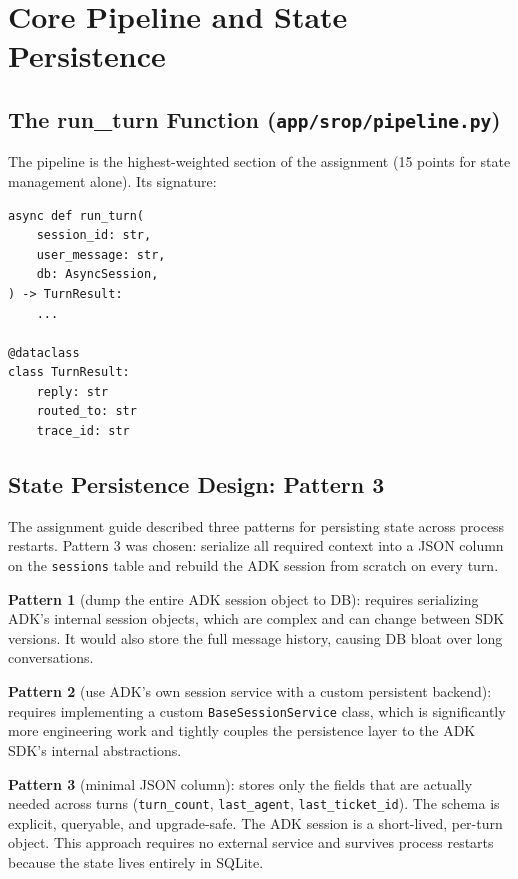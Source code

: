 \documentclass[12pt,a4paper]{article}
\begin{document}
\section{Core Pipeline and State Persistence}

\subsection{The run\_turn Function (\texttt{app/srop/pipeline.py})}

The pipeline is the highest-weighted section of the assignment (15 points for state management alone). Its signature:

\begin{lstlisting}[style=python]
async def run_turn(
    session_id: str,
    user_message: str,
    db: AsyncSession,
) -> TurnResult:
    ...

@dataclass
class TurnResult:
    reply: str
    routed_to: str
    trace_id: str
\end{lstlisting}

\subsection{State Persistence Design: Pattern 3}

The assignment guide described three patterns for persisting state across process restarts. Pattern 3 was chosen: serialize all required context into a JSON column on the \texttt{sessions} table and rebuild the ADK session from scratch on every turn.

\begin{tcolorbox}[defbox, title={Why Pattern 3 was chosen over Patterns 1 and 2}]
\textbf{Pattern 1} (dump the entire ADK session object to DB): requires serializing ADK's internal session objects, which are complex and can change between SDK versions. It would also store the full message history, causing DB bloat over long conversations.

\textbf{Pattern 2} (use ADK's own session service with a custom persistent backend): requires implementing a custom \texttt{BaseSessionService} class, which is significantly more engineering work and tightly couples the persistence layer to the ADK SDK's internal abstractions.

\textbf{Pattern 3} (minimal JSON column): stores only the fields that are actually needed across turns (\texttt{turn\_count}, \texttt{last\_agent}, \texttt{last\_ticket\_id}). The schema is explicit, queryable, and upgrade-safe. The ADK session is a short-lived, per-turn object. This approach requires no external service and survives process restarts because the state lives entirely in SQLite.
\end{tcolorbox}
\end{document}
